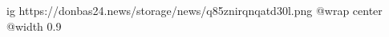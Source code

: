 
 
 
 
 

\ifcmt
  ig https://donbas24.news/storage/news/q85znirqnqatd30l.png
  @wrap center
  @width 0.9
\fi
